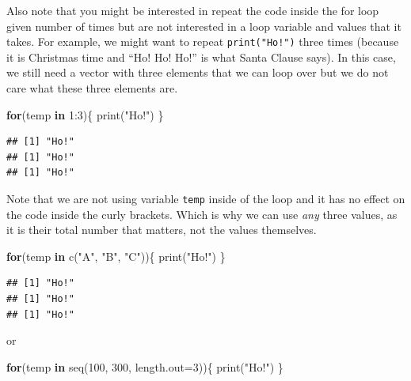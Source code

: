 \documentclass[
]{book}
\newenvironment{Shaded}{\begin{snugshade}}{\end{snugshade}}
\newcommand{\AttributeTok}[1]{\textcolor[rgb]{0.77,0.63,0.00}{#1}}
\newcommand{\ControlFlowTok}[1]{\textcolor[rgb]{0.13,0.29,0.53}{\textbf{#1}}}
\newcommand{\DecValTok}[1]{\textcolor[rgb]{0.00,0.00,0.81}{#1}}
\newcommand{\FunctionTok}[1]{\textcolor[rgb]{0.00,0.00,0.00}{#1}}
\newcommand{\NormalTok}[1]{#1}
\newcommand{\SpecialCharTok}[1]{\textcolor[rgb]{0.00,0.00,0.00}{#1}}
\newcommand{\StringTok}[1]{\textcolor[rgb]{0.31,0.60,0.02}{#1}}
\begin{document}
Also note that you might be interested in repeat the code inside the for loop given number of times but are not interested in a loop variable and values that it takes. For example, we might want to repeat \texttt{print("Ho!")} three times (because it is Christmas time and ``Ho! Ho! Ho!'' is what Santa Clause says). In this case, we still need a vector with three elements that we can loop over but we do not care what these three elements are.

\begin{Shaded}
\begin{Highlighting}[]
\ControlFlowTok{for}\NormalTok{(temp }\ControlFlowTok{in} \DecValTok{1}\SpecialCharTok{:}\DecValTok{3}\NormalTok{)\{}
  \FunctionTok{print}\NormalTok{(}\StringTok{"Ho!"}\NormalTok{)}
\NormalTok{\}}
\end{Highlighting}
\end{Shaded}

\begin{verbatim}
## [1] "Ho!"
## [1] "Ho!"
## [1] "Ho!"
\end{verbatim}

Note that we are not using variable \texttt{temp} inside of the loop and it has no effect on the code inside the curly brackets. Which is why we can use \emph{any} three values, as it is their total number that matters, not the values themselves.

\begin{Shaded}
\begin{Highlighting}[]
\ControlFlowTok{for}\NormalTok{(temp }\ControlFlowTok{in} \FunctionTok{c}\NormalTok{(}\StringTok{"A"}\NormalTok{, }\StringTok{"B"}\NormalTok{, }\StringTok{"C"}\NormalTok{))\{}
  \FunctionTok{print}\NormalTok{(}\StringTok{"Ho!"}\NormalTok{)}
\NormalTok{\}}
\end{Highlighting}
\end{Shaded}

\begin{verbatim}
## [1] "Ho!"
## [1] "Ho!"
## [1] "Ho!"
\end{verbatim}

or

\begin{Shaded}
\begin{Highlighting}[]
\ControlFlowTok{for}\NormalTok{(temp }\ControlFlowTok{in} \FunctionTok{seq}\NormalTok{(}\DecValTok{100}\NormalTok{, }\DecValTok{300}\NormalTok{, }\AttributeTok{length.out=}\DecValTok{3}\NormalTok{))\{}
  \FunctionTok{print}\NormalTok{(}\StringTok{"Ho!"}\NormalTok{)}
\NormalTok{\}}
\end{Highlighting}
\end{Shaded}
\end{document}
